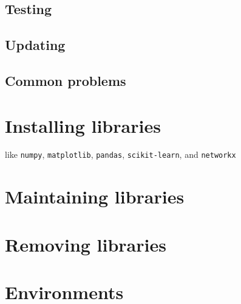 \subsection{Testing}

\subsection{Updating}

\subsection{Common problems}

\section{Installing libraries}
like \texttt{numpy}, \texttt{matplotlib}, \texttt{pandas}, \texttt{scikit-learn}, and \texttt{networkx}

\section{Maintaining libraries}

\section{Removing libraries}

\section{Environments}